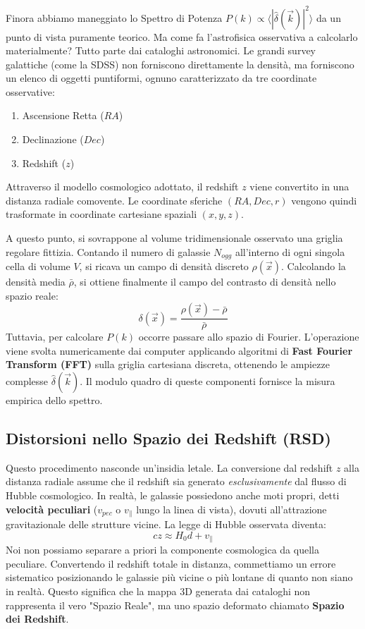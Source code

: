 \documentclass[11pt,a4paper]{report}
\begin{document}
Finora abbiamo maneggiato lo Spettro di Potenza $P(k) \propto \langle |\hat{\delta}(\vec{k})|^2 \rangle$ da un punto di vista puramente teorico. Ma come fa l'astrofisica osservativa a calcolarlo materialmente?
Tutto parte dai cataloghi astronomici. Le grandi survey galattiche (come la SDSS) non forniscono direttamente la densità, ma forniscono un elenco di oggetti puntiformi, ognuno caratterizzato da tre coordinate osservative:
\begin{enumerate}
    \item Ascensione Retta ($RA$)
    \item Declinazione ($Dec$)
    \item Redshift ($z$)
\end{enumerate}
Attraverso il modello cosmologico adottato, il redshift $z$ viene convertito in una distanza radiale comovente. Le coordinate sferiche $(RA, Dec, r)$ vengono quindi trasformate in coordinate cartesiane spaziali $(x, y, z)$. 

A questo punto, si sovrappone al volume tridimensionale osservato una griglia regolare fittizia. Contando il numero di galassie $N_{ogg}$ all'interno di ogni singola cella di volume $V$, si ricava un campo di densità discreto $\rho(\vec{x})$. 
Calcolando la densità media $\bar{\rho}$, si ottiene finalmente il campo del contrasto di densità nello spazio reale:
\begin{equation}
\delta(\vec{x}) = \frac{\rho(\vec{x}) - \bar{\rho}}{\bar{\rho}}
\end{equation}
Tuttavia, per calcolare $P(k)$ occorre passare allo spazio di Fourier. L'operazione viene svolta numericamente dai computer applicando algoritmi di \textbf{Fast Fourier Transform (FFT)} sulla griglia cartesiana discreta, ottenendo le ampiezze complesse $\hat{\delta}(\vec{k})$. Il modulo quadro di queste componenti fornisce la misura empirica dello spettro.

\subsection{Distorsioni nello Spazio dei Redshift (RSD)}
Questo procedimento nasconde un'insidia letale. La conversione dal redshift $z$ alla distanza radiale assume che il redshift sia generato \textit{esclusivamente} dal flusso di Hubble cosmologico. In realtà, le galassie possiedono anche moti propri, detti \textbf{velocità peculiari} ($v_{pec}$ o $v_\parallel$ lungo la linea di vista), dovuti all'attrazione gravitazionale delle strutture vicine.
La legge di Hubble osservata diventa:
\begin{equation}
cz \approx H_0 d + v_\parallel
\end{equation}
Noi non possiamo separare a priori la componente cosmologica da quella peculiare. Convertendo il redshift totale in distanza, commettiamo un errore sistematico posizionando le galassie più vicine o più lontane di quanto non siano in realtà. Questo significa che la mappa 3D generata dai cataloghi non rappresenta il vero "Spazio Reale", ma uno spazio deformato chiamato \textbf{Spazio dei Redshift}.
\end{document}
